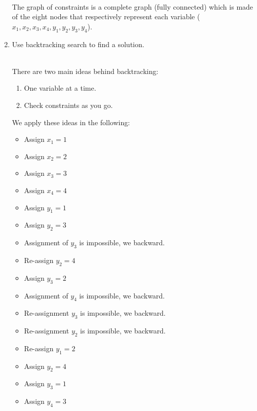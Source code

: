 \documentclass[9pt,a4paper]{extarticle}
\newenvironment{solution}
    {%
    \color{red}
    }
    { 
    \color{black}
    }
\begin{document}
\begin{enumerate}
       \begin{solution}
       \\
       The graph of constraints is a complete graph (fully connected) which is made of the eight nodes that respectively represent each variable ($x_1, x_2, x_3, x_4, y_1, y_2, y_3, y_4$).
       \end{solution}
       \item Use backtracking search to find a solution.
       \begin{solution}
       \\
       There are two main ideas behind backtracking:
       \begin{enumerate}
           \item One variable at a time.
           \item Check constraints as you go.
       \end{enumerate}
      We apply these ideas in the following:
       \begin{itemize}
           \item Assign $x_1 = 1$
           \item Assign $x_2 = 2$
           \item Assign $x_3 = 3$
           \item Assign $x_4 = 4$
           \item Assign $y_1 = 1$
           \item Assign $y_2 = 3$
           \item Assignment of $y_3$ is impossible, we backward.
           \item Re-assign $y_2 = 4$
           \item Assign $y_3 = 2$
           \item Assignment of $y_4$ is impossible, we backward.
           \item Re-assignment $y_3$ is impossible, we backward.
           \item Re-assignment $y_2$ is impossible, we backward.
           \item Re-assign $y_1 = 2$
           \item Assign $y_2 = 4$
           \item Assign $y_3 = 1$
           \item Assign $y_4 = 3$
           
       \end{itemize}
       \end{solution}
   \end{enumerate}
\end{document}
